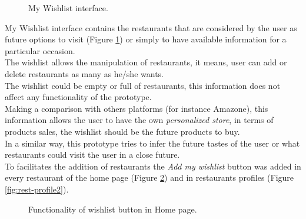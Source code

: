 \begin{figure}
\captionsetup{font=footnotesize}
\centering
{}
\caption{My Wishlist interface.}
\label{fig:mywishlist}   
\end{figure}
My Wishlist interface contains the restaurants that are  considered by
the user as future options to visit (Figure  \ref{fig:mywishlist}) or
simply to have available information for a particular  occasion. \\The
wishlist allows the manipulation of restaurants,  it means, user can
add or delete restaurants as many as  he/she wants. \\The wishlist could
be empty or full of  restaurants, this information does not affect any
functionality  of the prototype. \\
Making a comparison with others platforms (for instance 
Amazone), this information allows the user to have the own 
\textit{personalized store}, in terms of products sales, the wishlist 
should be the future products to buy.\\ In a similar way, 
this prototype tries to infer the future tastes of the user 
or what restaurants could visit the user in a close future. \\
To facilitates the addition of restaurants the \textit{Add my wishlist} 
button was added in every restaurant of the home 
page (Figure  \ref{fig:wishlist-home}) and in restaurants 
profiles (Figure  \ref{fig:rest-profile2}).
\begin{figure}
\captionsetup{font=footnotesize}
\centering
{}
\caption{Functionality of wishlist button in Home page.}
\label{fig:wishlist-home}   
\end{figure}

